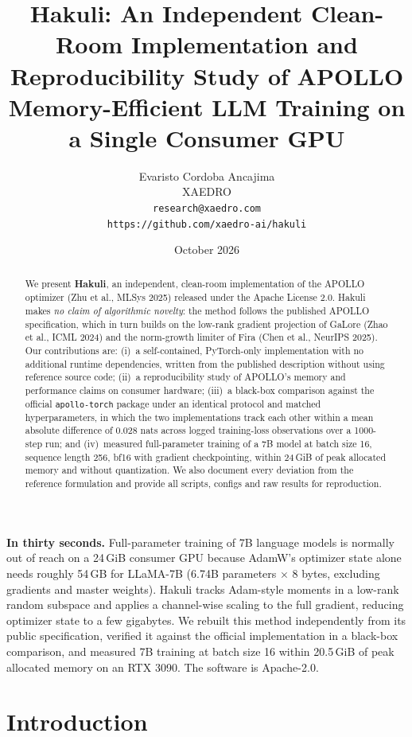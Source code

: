 \documentclass[11pt]{article}
\title{\textbf{Hakuli: An Independent Clean-Room Implementation and Reproducibility Study of APOLLO}\\[0.5em]
\large Memory-Efficient LLM Training on a Single Consumer GPU}
\author{
Evaristo Cordoba Ancajima \\
XAEDRO \\
\small\texttt{research@xaedro.com} \\
\small\texttt{https://github.com/xaedro-ai/hakuli}
}
\date{October 2026}
\begin{document}
\maketitle

\begin{abstract}
We present \textbf{Hakuli}, an independent, clean-room implementation of the
APOLLO optimizer (Zhu et al., MLSys 2025) released under the Apache License
2.0. Hakuli makes \emph{no claim of algorithmic novelty}: the method follows
the published APOLLO specification, which in turn builds on the low-rank
gradient projection of GaLore (Zhao et al., ICML 2024) and the norm-growth
limiter of Fira (Chen et al., NeurIPS 2025). Our contributions are: (i)~a
self-contained, PyTorch-only implementation with no additional runtime
dependencies, written from the published description without using reference
source code; (ii)~a reproducibility study of APOLLO's memory and performance
claims on consumer hardware; (iii)~a black-box comparison against the
official \texttt{apollo-torch} package under an identical protocol and
matched hyperparameters, in which the two implementations track each other
within a mean absolute difference of 0.028 nats across logged training-loss
observations over a 1000-step run; and
(iv)~measured full-parameter training of a 7B
model at batch size 16, sequence length 256, bf16 with gradient
checkpointing, within 24\,GiB of peak allocated memory and without
quantization. We also document every deviation from the reference
formulation and provide all scripts, configs and raw results for
reproduction.
\end{abstract}

\noindent\textbf{In thirty seconds.} Full-parameter training of 7B language
models is normally out of reach on a 24\,GiB consumer GPU because AdamW's
optimizer state alone needs roughly 54\,GB for LLaMA-7B (6.74B parameters
$\times$ 8 bytes, excluding gradients and master weights). Hakuli tracks
Adam-style moments in a low-rank random subspace and applies a channel-wise
scaling to the full gradient, reducing optimizer state to a few gigabytes. We
rebuilt this method independently from its public specification, verified it
against the official implementation in a black-box comparison, and measured
7B training at batch size 16 within 20.5\,GiB of peak allocated memory on an
RTX 3090. The software is Apache-2.0.

\section{Introduction}
\end{document}
